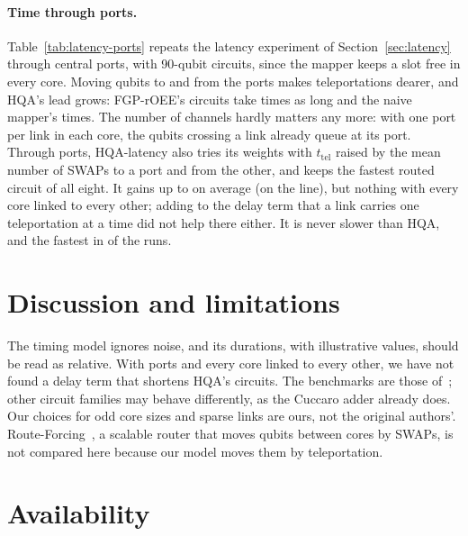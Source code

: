 \documentclass[11pt]{article}
\begin{document}
\paragraph{Time through ports.} Table~\ref{tab:latency-ports} repeats the
latency experiment of Section~\ref{sec:latency} through central ports, with
90-qubit circuits, since the mapper keeps a slot free in every core. Moving
qubits to and from the ports makes teleportations dearer, and HQA's lead
grows: FGP-rOEE's circuits take \portsFgpRange{} times as long and the naive
mapper's \portsNaiveRange{} times. The number of channels hardly matters any more: with one port
per link in each core, the qubits crossing a link already queue at its port.
Through ports, HQA-latency also tries its weights with $t_\mathrm{tel}$
raised by the mean number of SWAPs to a port and from the other, and keeps
the fastest routed circuit of all eight. It gains up to
\portsLatencyMeanBest{} on average (on the line), but nothing with every core
linked to every other; adding to the delay term that a link carries one
teleportation at a time did not help there either. It is never slower than
HQA, and the fastest in
\portsLatencyWins{} of the \portsLatencyRuns{} runs.

\begin{table}[t]
\centering

\caption{As Table~\ref{tab:latency}, through central ports, with 90-qubit
circuits.}
\label{tab:latency-ports}
\end{table}

\section{Discussion and limitations}

The timing model ignores noise, and its durations, with illustrative
values, should be read as relative. With ports and every core linked to
every other, we have not found a delay term that shortens HQA's circuits.
The benchmarks are those of~\cite{escofet2025revisiting}; other circuit
families may behave differently, as the Cuccaro adder already does. Our
choices for odd core sizes and sparse links are ours, not the original
authors'. Route-Forcing~\cite{escofet2024routeforcing}, a scalable router
that moves qubits between cores by SWAPs, is not compared here because our
model moves them by teleportation.

\section{Availability}
\end{document}
